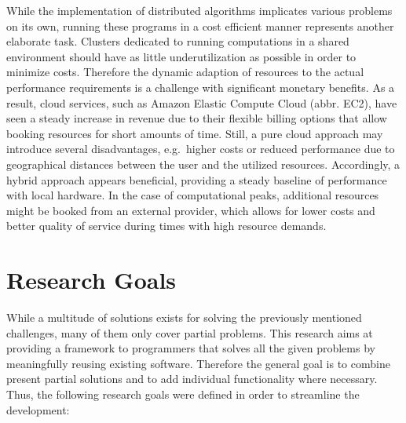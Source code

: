 While the implementation of distributed algorithms implicates various problems on its own, running these programs in a cost efficient manner represents another elaborate task. Clusters dedicated to running computations in a shared environment should have as little underutilization as possible in order to minimize costs. Therefore the dynamic adaption of resources to the actual performance requirements is a challenge with significant monetary benefits. As a result, cloud services, such as Amazon Elastic Compute Cloud (abbr. EC2), have seen a steady increase in revenue due to their flexible billing options that allow booking resources for short amounts of time\cite{gartner_2017}. Still, a pure cloud approach may introduce several disadvantages, e.g.~higher costs or reduced performance due to geographical distances between the user and the utilized resources. Accordingly, a hybrid approach appears beneficial, providing a steady baseline of performance with local hardware. In the case of computational peaks, additional resources might be booked from an external provider, which allows for lower costs and better quality of service during times with high resource demands.

\section*{Research Goals}
\label{goals}
While a multitude of solutions exists for solving the previously mentioned challenges, many of them only cover partial problems. This research aims at providing a framework to programmers that solves all the given problems by meaningfully reusing existing software. Therefore the general goal is to combine present partial solutions and to add individual functionality where necessary. Thus, the following research goals were defined in order to streamline the development:

